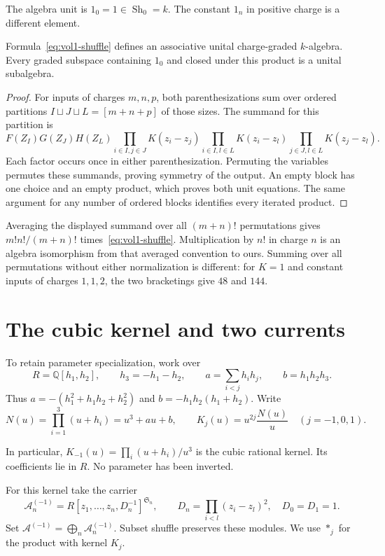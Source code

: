 The algebra unit is $1_0=1\in\operatorname{Sh}_0=k$.
The constant $1_n$ in positive charge is a different element.

\begin{theorem}
Formula~\eqref{eq:vol1-shuffle} defines an associative unital
charge-graded $k$-algebra.  Every graded subspace containing $1_0$
and closed under this product is a unital subalgebra.
\end{theorem}
\begin{proof}
For inputs of charges $m,n,p$, both parenthesizations sum over
ordered partitions $I\sqcup J\sqcup L=[m+n+p]$ of those sizes.
The summand for this partition is
\[
 F(Z_I)G(Z_J)H(Z_L)
 \prod_{i\in I,j\in J}K(z_i-z_j)
 \prod_{i\in I,l\in L}K(z_i-z_l)
 \prod_{j\in J,l\in L}K(z_j-z_l).
\]
Each factor occurs once in either parenthesization.  Permuting the
variables permutes these summands, proving symmetry of the output.
An empty block has one choice and an empty product, which proves
both unit equations.  The same argument for any number of ordered
blocks identifies every iterated product.
\end{proof}

Averaging the displayed summand over all $(m+n)!$ permutations gives
$m!n!/(m+n)!$ times~\eqref{eq:vol1-shuffle}.
Multiplication by $n!$ in charge $n$ is an algebra isomorphism from
that averaged convention to ours.  Summing over all permutations
without either normalization is different: for $K=1$ and constant
inputs of charges $1,1,2$, the two bracketings give $48$ and $144$.

\section{The cubic kernel and two currents}
To retain parameter specialization, work over
\[
 R=\mathbb Q[h_1,h_2],\qquad h_3=-h_1-h_2,
 \qquad a=\sum_{i<j}h_ih_j,\qquad b=h_1h_2h_3.
\]
Thus $a=-(h_1^2+h_1h_2+h_2^2)$ and $b=-h_1h_2(h_1+h_2)$.
Write
\[
 N(u)=\prod_{i=1}^3(u+h_i)=u^3+au+b,
 \qquad K_j(u)=u^{2j}\frac{N(u)}u\quad(j=-1,0,1).
\]

In particular, $K_{-1}(u)=\prod_i(u+h_i)/u^3$ is the cubic
rational kernel.  Its coefficients lie in $R$.  No parameter has been inverted.  

For this kernel take the carrier
\[
 \mathcal A^{(-1)}_n
 =R[z_1,\ldots,z_n,D_n^{-1}]^{\mathfrak S_n},
 \qquad D_n=\prod_{i<l}(z_i-z_l)^2,\quad D_0=D_1=1.
\]
Set $\mathcal A^{(-1)}=\bigoplus_n\mathcal A^{(-1)}_n$.
Subset shuffle preserves these modules.  We use $*_j$ for the
product with kernel $K_j$.

